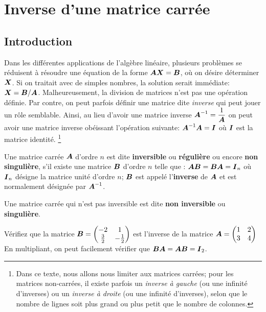 \chapter{Inverse d'une matrice carrée}
 

 
 \section{Introduction}
 Dans les différentes applications de l'algèbre linéaire, plusieurs
 problèmes se réduisent à résoudre une équation de la forme
 $\boldsymbol{A}\boldsymbol{X} = \boldsymbol{B}$, où on désire déterminer $\boldsymbol{X}$.  Si on traitait avec de simples nombres, la solution
 serait immédiate: $\boldsymbol{X} = \boldsymbol{B}/\boldsymbol{A}$.  Malheureusement, la division
 de matrices n'est pas une opération définie.  Par contre, on
 peut parfois définir une matrice dite \textit{inverse} qui peut jouer
 un rôle semblable.  Ainsi, au lieu d'avoir une matrice inverse
$\displaystyle
 \boldsymbol{A}^{-1} = \frac{1}{\boldsymbol{A}}
$
 on peut avoir une matrice inverse obéissant l'opération suivante:
 $\displaystyle
 \boldsymbol{A}^{-1}\boldsymbol{A} = \boldsymbol{I}
$
 où $\boldsymbol{I}$ est la matrice identité.  \footnote{Dans ce texte, nous allons nous limiter
 aux matrices carrées; pour les matrices non-carrées, il existe parfois un
 \textit{inverse à gauche} (ou une infinité d'inverses) ou un \textit{inverse à droite} (ou une infinité d'inverses), selon que le nombre
 de lignes soit plus grand ou plus petit que le nombre de colonnes.}
 

 
 \begin{defini}
Une matrice carrée $\boldsymbol{A}$ d'ordre $n$ est dite  \textbf{inversible} ou  \textbf{régulière} ou encore \textbf{non  singulière}, s'il existe une matrice $\boldsymbol{B}$ d'ordre $n$ telle que :
$\boldsymbol{A}\boldsymbol{B} = \boldsymbol{B}\boldsymbol{A} = \boldsymbol{I}_n$ où $\boldsymbol{I}_n$ désigne la matrice unité d'ordre $n$; $\boldsymbol{B}$ est appelé l'\textbf{inverse} de $\boldsymbol{A}$ et est normalement désignée par $\boldsymbol{A}^{-1}$.
 \end{defini}
Une matrice carrée qui n'est pas inversible est dite \textbf{non inversible} ou \textbf{singulière}.

\begin{exemple}
Vérifiez que la matrice
$\displaystyle
\boldsymbol{B} = \begin{pmatrix}
-2 & 1 \\
\frac{3}{2} & -\frac{1}{2}
\end{pmatrix}
$
est l'inverse de la matrice
$\displaystyle
 \boldsymbol{A} = \begin{pmatrix}
 1 & 2 \\
 3 & 4
 \end{pmatrix}
 $
 \solution
 En multipliant, on peut facilement vérifier que $\boldsymbol{B}\boldsymbol{A} = \boldsymbol{A}\boldsymbol{B} = \boldsymbol{I}_2$.
 \end{exemple}
 
